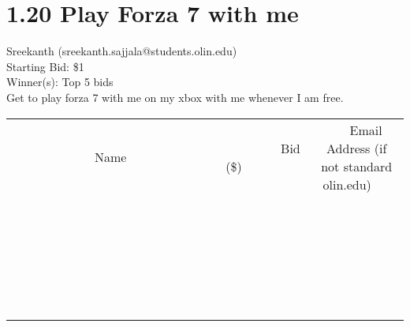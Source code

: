 \documentclass[11pt]{article}
\begin{document}
\section*{1.20 Play Forza 7 with me}
Sreekanth (sreekanth.sajjala@students.olin.edu) \\
Starting Bid: \$1 \\
Winner(s): 
Top 5 bids \\
Get to play forza 7 with me on my xbox with me whenever I am free. \\[6ex]
\begin{tabular}{c c c}
~~~~~~~~~~~~~Name~~~~~~~~~~~~~ & ~~~~~~~~~Bid (\$)~~~~~~~~~ & ~~~Email Address (if not standard olin.edu)~~~ \\
 & & \\
\hline
 & & \\
\hline
 & & \\
\hline
 & & \\
\hline
 & & \\
\hline
 & & \\
\hline
 & & \\
\hline
 & & \\
\hline
 & & \\
\hline
 & & \\
\hline
 & & \\
\hline
 & & \\
\hline
 & & \\
\hline
 & & \\
\hline
 & & \\
\hline
 & & \\
\hline
 & & \\
\hline
 & & \\
\hline
 & & \\
\hline
 & & \\
\hline
 & & \\
\hline
 & & \\
\hline
 & & \\
\hline
 & & \\
\hline
 & & \\
\hline
 & & \\
\hline
\end{tabular}
\clearpage
\end{document}
